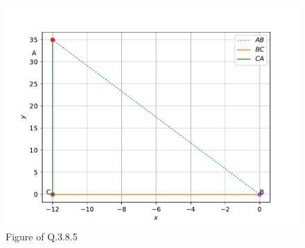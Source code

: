 \begin{enumerate}[label=\thesection.\arabic*.,ref=\thesection.\theenumi]
\begin{figure}[!ht]
	\centering
	\includegraphics[width=\columnwidth]{./figs/lines/q12.pdf}
	\caption{Figure of Q.3.8.5}
	\label{fig:qtwelve}	
	\end{figure}
	


\end{enumerate}
